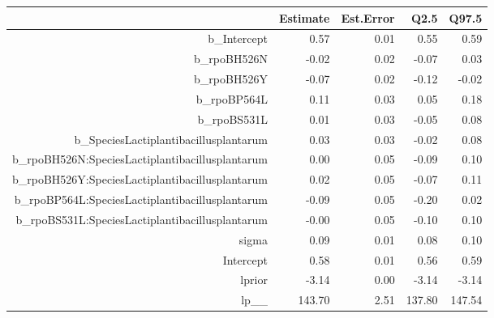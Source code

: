 \begin{table}[ht]
\centering
\begin{tabular}{rrrrr}
  \hline
 & Estimate & Est.Error & Q2.5 & Q97.5 \\ 
  \hline
b\_Intercept & 0.57 & 0.01 & 0.55 & 0.59 \\ 
  b\_rpoBH526N & -0.02 & 0.02 & -0.07 & 0.03 \\ 
  b\_rpoBH526Y & -0.07 & 0.02 & -0.12 & -0.02 \\ 
  b\_rpoBP564L & 0.11 & 0.03 & 0.05 & 0.18 \\ 
  b\_rpoBS531L & 0.01 & 0.03 & -0.05 & 0.08 \\ 
  b\_SpeciesLactiplantibacillusplantarum & 0.03 & 0.03 & -0.02 & 0.08 \\ 
  b\_rpoBH526N:SpeciesLactiplantibacillusplantarum & 0.00 & 0.05 & -0.09 & 0.10 \\ 
  b\_rpoBH526Y:SpeciesLactiplantibacillusplantarum & 0.02 & 0.05 & -0.07 & 0.11 \\ 
  b\_rpoBP564L:SpeciesLactiplantibacillusplantarum & -0.09 & 0.05 & -0.20 & 0.02 \\ 
  b\_rpoBS531L:SpeciesLactiplantibacillusplantarum & -0.00 & 0.05 & -0.10 & 0.10 \\ 
  sigma & 0.09 & 0.01 & 0.08 & 0.10 \\ 
  Intercept & 0.58 & 0.01 & 0.56 & 0.59 \\ 
  lprior & -3.14 & 0.00 & -3.14 & -3.14 \\ 
  lp\_\_ & 143.70 & 2.51 & 137.80 & 147.54 \\ 
   \hline
\end{tabular}
\end{table}
